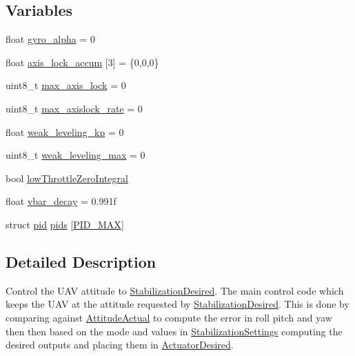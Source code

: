 \subsection*{\-Variables}
\begin{DoxyCompactItemize}
\item 
float \hyperlink{group___stabilization_module_gaf51ebd613903cfff91be0878961b04cf}{gyro\-\_\-alpha} = 0
\item 
float \hyperlink{group___stabilization_module_ga1b6fc01b4acff35c8b4875e91fb63bce}{axis\-\_\-lock\-\_\-accum} \mbox{[}3\mbox{]} = \{0,0,0\}
\item 
uint8\-\_\-t \hyperlink{group___stabilization_module_ga9d12f9314c47dcc57be19ca03b5ac09a}{max\-\_\-axis\-\_\-lock} = 0
\item 
uint8\-\_\-t \hyperlink{group___stabilization_module_ga94dd677918bcbe2c1ee026d1c1f95fd1}{max\-\_\-axislock\-\_\-rate} = 0
\item 
float \hyperlink{group___stabilization_module_ga0ed1377fcc1a59ba76172e76b113704d}{weak\-\_\-leveling\-\_\-kp} = 0
\item 
uint8\-\_\-t \hyperlink{group___stabilization_module_gac1659053cf18ba9ead672d2795fb6941}{weak\-\_\-leveling\-\_\-max} = 0
\item 
bool \hyperlink{group___stabilization_module_gaf67afab9d5822cab800d87ee04512e53}{low\-Throttle\-Zero\-Integral}
\item 
float \hyperlink{group___stabilization_module_ga953d14b1e6e45afc361e0898296bf346}{vbar\-\_\-decay} = 0.\-991f
\item 
struct \hyperlink{structpid}{pid} \hyperlink{group___stabilization_module_ga1b7c75ff9222444babfe603f25b91233}{pids} \mbox{[}\hyperlink{group___stabilization_module_gga99fb83031ce9923c84392b4e92f956b5aa9ba8c316889eca7f244f9e458323e1c}{\-P\-I\-D\-\_\-\-M\-A\-X}\mbox{]}
\end{DoxyCompactItemize}


\subsection{\-Detailed \-Description}
\-Control the \-U\-A\-V attitude to \hyperlink{group___stabilization_desired}{\-Stabilization\-Desired}. \-The main control code which keeps the \-U\-A\-V at the attitude requested by \hyperlink{group___stabilization_desired}{\-Stabilization\-Desired}. \-This is done by comparing against \hyperlink{group___attitude_actual}{\-Attitude\-Actual} to compute the error in roll pitch and yaw then then based on the mode and values in \hyperlink{group___stabilization_settings}{\-Stabilization\-Settings} computing the desired outputs and placing them in \hyperlink{group___actuator_desired}{\-Actuator\-Desired}. 

